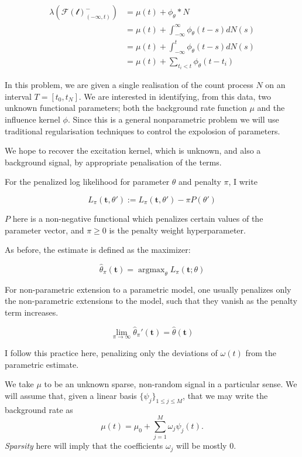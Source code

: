 \documentclass[11pt]{article}
\def\lt{<}
\begin{document}
\[
\begin{aligned}
\lambda(\mathcal{F(t)}^-_{(-\infty,t)}) &= \mu(t) + \phi_\theta * N\\
&= \mu(t)  + \int_{-\infty}^{\infty}\phi_\theta(t-s)dN(s)\\
&= \mu(t) + \int_{-\infty}^{t}\phi_\theta(t-s)dN(s)\\
&= \mu(t) + \sum_{t_i\lt t}\phi_\theta(t-t_i)
\end{aligned}
\]

In this problem, we are given a single realisation of the count process
$N$ on an interval $T=[t_0,t_N]$. We are interested in identifying, from
this data, two unknown functional parameters; both the background rate
function $\mu$ and the influence kernel $\phi$. Since this is a general
nonparametric problem we will use traditional regularisation techniques
to control the expolosion of parameters.

    We hope to recover the excitation kernel, which is unknown, and also a
background signal, by appropriate penalisation of the terms.

For the penalized log likelihood for parameter $\theta$ and penalty
$\pi$, I write

\[L_\pi(\mathbf t, \theta'):= L_\pi(\mathbf t, \theta')- \pi P(\theta')\]

$P$ here is a non-negative functional which penalizes certain values of
the parameter vector, and $\pi\geq 0$ is the penalty weight
hyperparameter.

As before, the estimate is defined as the maximizer:

\[\hat{\theta}_\pi(\mathbf t) = \operatorname{argmax}_\theta L_\pi(\mathbf t;\theta)\]

For non-parametric extension to a parametric model, one usually
penalizes only the non-parametric extensions to the model, such that
they vanish as the penalty term increases. \cite{green_penalized_1987}

\[\lim_{\pi\to\infty}\hat{\theta}_\pi'(\mathbf t) =\hat{\theta}(\mathbf t)\]

I follow this practice here, penalizing only the deviations of
$\omega(t)$ from the parametric estimate.

    We take $\mu$ to be an unknown sparse, non-random signal in a particular
sense. We will assume that, given a linear basis
$\{\psi_j \}_{1\leq j\leq M}$, that we may write the background rate as
\[\mu(t) = \mu_0 + \sum_{j=1}^M  \omega_j \psi_j(t).\] \emph{Sparsity}
here will imply that the coefficients $\omega_j$ will be mostly 0.
\end{document}

